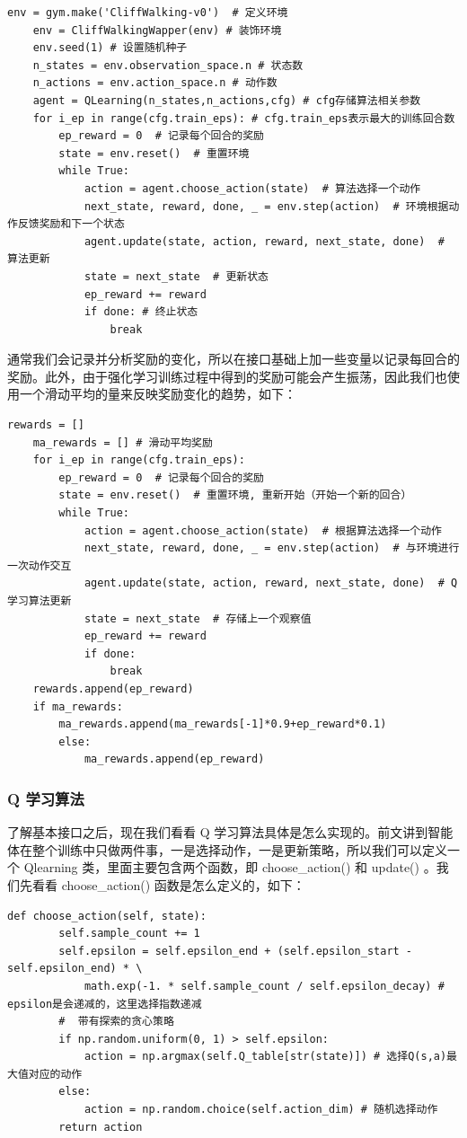 \begin{lstlisting}[style=Python]
    env = gym.make('CliffWalking-v0')  # 定义环境
    env = CliffWalkingWapper(env) # 装饰环境
    env.seed(1) # 设置随机种子
    n_states = env.observation_space.n # 状态数
    n_actions = env.action_space.n # 动作数
    agent = QLearning(n_states,n_actions,cfg) # cfg存储算法相关参数
    for i_ep in range(cfg.train_eps): # cfg.train_eps表示最大的训练回合数
        ep_reward = 0  # 记录每个回合的奖励
        state = env.reset()  # 重置环境
        while True: 
            action = agent.choose_action(state)  # 算法选择一个动作
            next_state, reward, done, _ = env.step(action)  # 环境根据动作反馈奖励和下一个状态
            agent.update(state, action, reward, next_state, done)  # 算法更新
            state = next_state  # 更新状态
            ep_reward += reward
            if done: # 终止状态
                break
\end{lstlisting}

通常我们会记录并分析奖励的变化，所以在接口基础上加一些变量以记录每回合的奖励。此外，由于强化学习训练过程中得到的奖励可能会产生振荡，因此我们也使用一个滑动平均的量来反映奖励变化的趋势，如下：

\begin{lstlisting}[style=Python]
    rewards = []  
    ma_rewards = [] # 滑动平均奖励
    for i_ep in range(cfg.train_eps):
        ep_reward = 0  # 记录每个回合的奖励
        state = env.reset()  # 重置环境, 重新开始（开始一个新的回合）
        while True:
            action = agent.choose_action(state)  # 根据算法选择一个动作
            next_state, reward, done, _ = env.step(action)  # 与环境进行一次动作交互
            agent.update(state, action, reward, next_state, done)  # Q学习算法更新
            state = next_state  # 存储上一个观察值
            ep_reward += reward
            if done:
                break
    rewards.append(ep_reward)
    if ma_rewards:
        ma_rewards.append(ma_rewards[-1]*0.9+ep_reward*0.1)
        else:
            ma_rewards.append(ep_reward)
\end{lstlisting}

\subsubsection{ Q 学习算法}

了解基本接口之后，现在我们看看 Q 学习算法具体是怎么实现的。前文讲到智能体在整个训练中只做两件事，一是选择动作，一是更新策略，所以我们可以定义一个 Qlearning 类，里面主要包含两个函数，即 choose\_action() 和 update() 。我们先看看 choose\_action() 函数是怎么定义的，如下：
\begin{lstlisting}[style=Python]
    def choose_action(self, state):
        self.sample_count += 1
        self.epsilon = self.epsilon_end + (self.epsilon_start - self.epsilon_end) * \
            math.exp(-1. * self.sample_count / self.epsilon_decay) # epsilon是会递减的，这里选择指数递减
        #  带有探索的贪心策略
        if np.random.uniform(0, 1) > self.epsilon:
            action = np.argmax(self.Q_table[str(state)]) # 选择Q(s,a)最大值对应的动作
        else:
            action = np.random.choice(self.action_dim) # 随机选择动作
        return action
\end{lstlisting}

